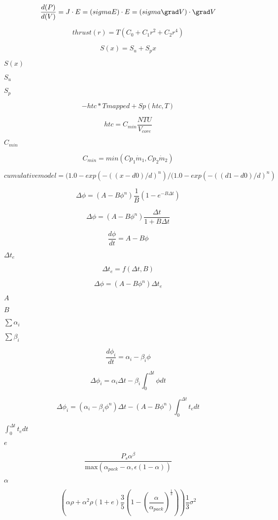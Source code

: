 \documentclass{article}
\begin{document}
\[ \frac{d(P)}{d(V)} = J \cdot E = (sigma E) \cdot E = (sigma \grad V) \cdot \grad V \]
\pagebreak

\[ thrust(r) = T (C_0 + C_1 r^2 + C_2 r^4) \]
\pagebreak

\[ S(x) = S_u + S_p x \]
\pagebreak

$ S(x) $
\pagebreak

$ S_u $
\pagebreak

$ S_p $
\pagebreak

\[ -htc*Tmapped + Sp(htc, T) \]
\pagebreak

\[ htc = C_{min} \frac{NTU}{V_{core}} \]
\pagebreak

$ C_{min} $
\pagebreak

\[ C_{min} = min \left(Cp_1 \dot{m}_1, Cp_2 \dot{m}_2 \right) \]
\pagebreak

\[ cumulative model = (1.0 - exp( -(( x - d0)/d)^n ) / (1.0 - exp( -((d1 - d0)/d)^n ) \]
\pagebreak

\[ \Delta \phi = (A - B \phi^n) \frac{1}{B} (1 - e^{- B \Delta t}) \]
\pagebreak

\[ \Delta \phi = (A - B \phi^n) \frac{\Delta t}{1 + B \Delta t} \]
\pagebreak

\[ \frac{d \phi}{d t} = A - B \phi \]
\pagebreak

$\Delta t_e$
\pagebreak

\[ \Delta t_e = f(\Delta t, B) \]
\pagebreak

\[ \Delta \phi = (A - B \phi^n) \Delta t_e \]
\pagebreak

$A$
\pagebreak

$B$
\pagebreak

$\sum \alpha_i$
\pagebreak

$\sum \beta_i$
\pagebreak

\[ \frac{d \phi_i}{d t} = \alpha_i - \beta_i \phi \]
\pagebreak

\[ \Delta \phi_i = \alpha_i \Delta t - \beta_i \int_0^{\Delta t} \phi d t \]
\pagebreak

\[ \Delta \phi_i = (\alpha_i - \beta_i \phi^n) \Delta t - (A - B \phi^n) \int_0^{\Delta t} t_e dt \]
\pagebreak

$\int_0^{\Delta t} t_e dt$
\pagebreak

$e$
\pagebreak

\[ \frac{P_s \alpha^\beta}{ \mathrm{max} \left( \alpha_{pack} - \alpha , \epsilon ( 1 - \alpha ) \right) } \]
\pagebreak

$\alpha$
\pagebreak

\[ \left( \alpha \rho + \alpha^2 \rho (1 + e) \frac{3}{5} \left( 1 - \left( \frac{\alpha}{\alpha_{pack}} \right)^\frac{1}{3} \right) \right) \frac{1}{3} \sigma^2 \]
\pagebreak
\end{document}
